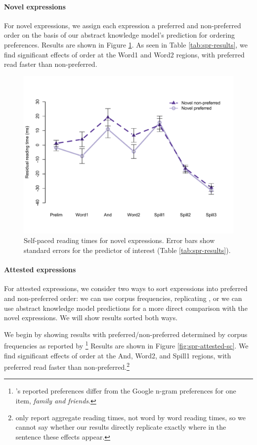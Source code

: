 \documentclass[authoryear]{elsarticle}
\begin{document}
\paragraph{Novel expressions}
For novel expressions, we assign each expression a preferred and non-preferred order on the basis of our abstract knowledge model's prediction for ordering preferences. Results are shown in Figure \ref{fig:spr-novel}. As seen in Table \ref{tab:spr-results}, we find significant effects of order at the Word1 and Word2 regions, with preferred read faster than non-preferred.

\begin{figure}[t]
\includegraphics[scale=0.8]{spr-novel.pdf}
\caption{Self-paced reading times for novel expressions. Error bars show standard errors for the predictor of interest (Table \ref{tab:spr-results}).} \label{fig:spr-novel}
\end{figure}

\paragraph{Attested expressions}
For attested expressions, we consider two ways to sort expressions into preferred and non-preferred order: we can use corpus frequencies, replicating \citet{SiyanovaChanturia:2011ep}, or we can use abstract knowledge model predictions for a more direct comparison with the novel expressions. We will show results sorted both ways.

We begin by showing results with preferred/non-preferred determined by corpus frequencies as reported by \citeauthor{SiyanovaChanturia:2011ep}\footnote{\citeauthor{SiyanovaChanturia:2011ep}'s reported preferences differ from the Google n-gram preferences for one item, \emph{family and friends}.}  Results are shown in Figure \ref{fig:spr-attested-sc}. We find significant effects of order at the And, Word2, and Spill1 regions, with preferred read faster than non-preferred.\footnote{ \citeauthor{SiyanovaChanturia:2011ep} only report aggregate reading times, not word by word reading times, so we cannot say whether our results directly replicate exactly where in the sentence these effects appear.}
\end{document}
